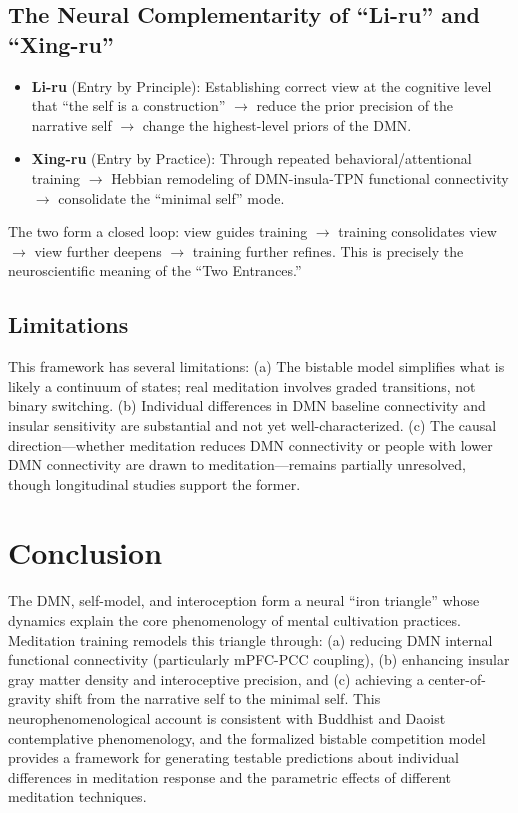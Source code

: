 \documentclass[11pt,a4paper]{article}
\begin{document}
\subsection{The Neural Complementarity of ``Li-ru'' and ``Xing-ru''}

\begin{itemize}[nosep]
    \item \textbf{Li-ru} (Entry by Principle): Establishing correct view at the cognitive level that ``the self is a construction'' $\rightarrow$ reduce the prior precision of the narrative self $\rightarrow$ change the highest-level priors of the DMN.
    \item \textbf{Xing-ru} (Entry by Practice): Through repeated behavioral/attentional training $\rightarrow$ Hebbian remodeling of DMN-insula-TPN functional connectivity $\rightarrow$ consolidate the ``minimal self'' mode.
\end{itemize}

The two form a closed loop: view guides training $\rightarrow$ training consolidates view $\rightarrow$ view further deepens $\rightarrow$ training further refines. This is precisely the neuroscientific meaning of the ``Two Entrances.''

\subsection{Limitations}

This framework has several limitations: (a) The bistable model simplifies what is likely a continuum of states; real meditation involves graded transitions, not binary switching. (b) Individual differences in DMN baseline connectivity and insular sensitivity are substantial and not yet well-characterized. (c) The causal direction---whether meditation reduces DMN connectivity or people with lower DMN connectivity are drawn to meditation---remains partially unresolved, though longitudinal studies \cite{Holzel2008} support the former.

\section{Conclusion}

The DMN, self-model, and interoception form a neural ``iron triangle'' whose dynamics explain the core phenomenology of mental cultivation practices. Meditation training remodels this triangle through: (a) reducing DMN internal functional connectivity (particularly mPFC-PCC coupling), (b) enhancing insular gray matter density and interoceptive precision, and (c) achieving a center-of-gravity shift from the narrative self to the minimal self. This neurophenomenological account is consistent with Buddhist and Daoist contemplative phenomenology, and the formalized bistable competition model provides a framework for generating testable predictions about individual differences in meditation response and the parametric effects of different meditation techniques.
\end{document}
